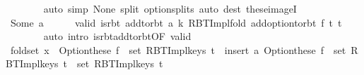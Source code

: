 \begin{isabellebody}
\ \ \ \ \ \ \isamarkupfalse%
\ {\isacharparenleft}{\kern0pt}auto\ simp{\isacharcolon}{\kern0pt}\ None\ split{\isacharcolon}{\kern0pt}\ option{\isachardot}{\kern0pt}splits{\isacharparenright}{\kern0pt}\ {\isacharparenleft}{\kern0pt}auto\ dest{\isacharcolon}{\kern0pt}\ these{\isacharunderscore}{\kern0pt}imageI{\isacharparenright}{\kern0pt}\isanewline
\ \ \isamarkupfalse%
\isanewline
\ \ \ \ \isamarkupfalse%
\ {\isacharparenleft}{\kern0pt}Some\ a{\isacharparenright}{\kern0pt}\isanewline
\ \ \ \ \isamarkupfalse%
\ valid{\isacharprime}{\kern0pt}{\isacharcolon}{\kern0pt}\ {\isachardoublequoteopen}is{\isacharunderscore}{\kern0pt}rbt\ {\isacharparenleft}{\kern0pt}add{\isacharunderscore}{\kern0pt}to{\isacharunderscore}{\kern0pt}rbt\ {\isacharparenleft}{\kern0pt}a{\isacharcomma}{\kern0pt}\ k{\isacharparenright}{\kern0pt}\ {\isacharparenleft}{\kern0pt}RBT{\isacharunderscore}{\kern0pt}Impl{\isachardot}{\kern0pt}fold\ {\isacharparenleft}{\kern0pt}add{\isacharunderscore}{\kern0pt}option{\isacharunderscore}{\kern0pt}to{\isacharunderscore}{\kern0pt}rbt\ f{\isacharparenright}{\kern0pt}\ t{}\ t{\isacharprime}{\kern0pt}{\isacharparenright}{\kern0pt}{\isacharparenright}{\kern0pt}{\isachardoublequoteclose}\isanewline
\ \ \ \ \ \ \isamarkupfalse%
\ {\isacharparenleft}{\kern0pt}auto\ intro{\isacharcolon}{\kern0pt}\ is{\isacharunderscore}{\kern0pt}rbt{\isacharunderscore}{\kern0pt}add{\isacharunderscore}{\kern0pt}to{\isacharunderscore}{\kern0pt}rbt{\isacharbrackleft}{\kern0pt}OF\ valid{\isacharbrackright}{\kern0pt}{\isacharparenright}{\kern0pt}\isanewline
\ \ \ \ \isamarkupfalse%
\ fold{\isacharunderscore}{\kern0pt}set{\isacharcolon}{\kern0pt}\ {\isachardoublequoteopen}x\ {\isasymin}\ Option{\isachardot}{\kern0pt}these\ {\isacharparenleft}{\kern0pt}f\ {\isacharbackquote}{\kern0pt}\ set\ {\isacharparenleft}{\kern0pt}RBT{\isacharunderscore}{\kern0pt}Impl{\isachardot}{\kern0pt}keys\ t{}{\isacharparenright}{\kern0pt}{\isacharparenright}{\kern0pt}\ {\isasymunion}\ {\isacharparenleft}{\kern0pt}insert\ a\ {\isacharparenleft}{\kern0pt}Option{\isachardot}{\kern0pt}these\ {\isacharparenleft}{\kern0pt}f\ {\isacharbackquote}{\kern0pt}\ set\ {\isacharparenleft}{\kern0pt}RBT{\isacharunderscore}{\kern0pt}Impl{\isachardot}{\kern0pt}keys\ t{}{\isacharparenright}{\kern0pt}{\isacharparenright}{\kern0pt}\ {\isasymunion}\ set\ {\isacharparenleft}{\kern0pt}RBT{\isacharunderscore}{\kern0pt}Impl{\isachardot}{\kern0pt}keys\ t{\isacharprime}{\kern0pt}{\isacharparenright}{\kern0pt}{\isacharparenright}{\kern0pt}{\isacharparenright}{\kern0pt}\ {\isasymlongleftrightarrow}\isanewline

\end{isabellebody}
